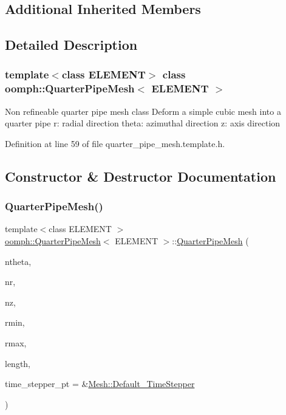 \subsection*{Additional Inherited Members}


\subsection{Detailed Description}
\subsubsection*{template$<$class E\+L\+E\+M\+E\+NT$>$\newline
class oomph\+::\+Quarter\+Pipe\+Mesh$<$ E\+L\+E\+M\+E\+N\+T $>$}

Non refineable quarter pipe mesh class Deform a simple cubic mesh into a quarter pipe r\+: radial direction theta\+: azimuthal direction z\+: axis direction 

Definition at line 59 of file quarter\+\_\+pipe\+\_\+mesh.\+template.\+h.



\subsection{Constructor \& Destructor Documentation}
\mbox{\label{classoomph_1_1QuarterPipeMesh_a453b84a80ccde867b8526e538135f43b}} 
\subsubsection{\texorpdfstring{Quarter\+Pipe\+Mesh()}{QuarterPipeMesh()}}
{\footnotesize\ttfamily template$<$class E\+L\+E\+M\+E\+NT $>$ \\
\hyperlink{classoomph_1_1QuarterPipeMesh}{oomph\+::\+Quarter\+Pipe\+Mesh}$<$ E\+L\+E\+M\+E\+NT $>$\+::\hyperlink{classoomph_1_1QuarterPipeMesh}{Quarter\+Pipe\+Mesh} (\begin{DoxyParamCaption}\item[{const unsigned \&}]{ntheta,  }\item[{const unsigned \&}]{nr,  }\item[{const unsigned \&}]{nz,  }\item[{const double \&}]{rmin,  }\item[{const double \&}]{rmax,  }\item[{const double \&}]{length,  }\item[{\hyperlink{classoomph_1_1TimeStepper}{Time\+Stepper} $\ast$}]{time\+\_\+stepper\+\_\+pt = {\ttfamily \&\hyperlink{classoomph_1_1Mesh_a12243d0fee2b1fcee729ee5a4777ea10}{Mesh\+::\+Default\+\_\+\+Time\+Stepper}} }\end{DoxyParamCaption})}



